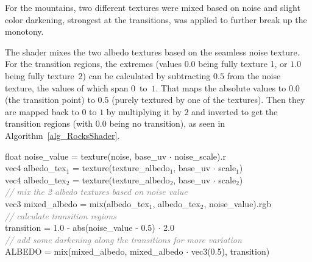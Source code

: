 



For the mountains, two different textures were mixed based on noise and slight color darkening, strongest at the transitions, was applied to further break up the monotony.

The shader mixes the two albedo textures based on the seamless noise texture. For the transition regions, the extremes (values $0.0$ being fully texture 1, or $1.0$ being fully texture~2) can be calculated by subtracting $0.5$ from the noise texture, the values of which span $0$~to~$1$. That maps the absolute values to $0.0$ (the transition point) to $0.5$ (purely textured by one of the textures). Then they are mapped back to $0$ to $1$ by multiplying it by $2$ and inverted to get the transition regions (with $0.0$ being no transition), as seen in Algorithm~\ref{alg_RocksShader}.

\begin{algorithm}
\label{alg_RocksShader}
\caption{Rocks fragment shader.}
float noise\_value = texture(noise, base\_uv $\cdot$ noise\_scale).r\\
vec4 albedo\_tex$_1$ = texture(texture\_albedo$_1$, base\_uv $\cdot$ scale$_1$)\\
vec4 albedo\_tex$_2$ = texture(texture\_albedo$_2$, base\_uv $\cdot$ scale$_2$)\\
\textcolor{gray}{\textit{// mix the 2 albedo textures based on noise value}}\\
vec3 mixed\_albedo = mix(albedo\_tex$_1$, albedo\_tex$_2$, noise\_value).rgb\\
\textcolor{gray}{\textit{// calculate transition regions}}\\
transition = 1.0 - abs(noise\_value - 0.5) $\cdot$ 2.0\\
\textcolor{gray}{\textit{// add some darkening along the transitions for more variation}}\\
ALBEDO = mix(mixed\_albedo, mixed\_albedo $\cdot$ vec3(0.5), transition)
\end{algorithm}

